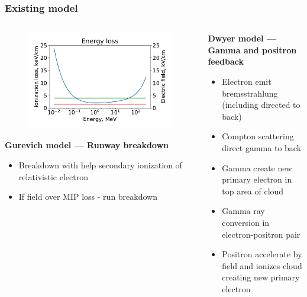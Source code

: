 \documentclass[8pt,pdf,hyperref={unicode}]{beamer}
\begin{document}
\begin{frame}
\frametitle{Existing model}
\begin{columns}
\begin{column}{0.5\textwidth}
    \begin{figure}[htb]
        \centering
        \includegraphics[width=1\columnwidth]{01_Gurevich.pdf}
    \end{figure}
{\large     \textbf{Gurevich model --- Runway breakdown}
\begin{itemize}
    \item Breakdown with help secondary ionization of relativistic electron
    \item If field over MIP loss - run breakdown
\end{itemize}}
\end{column}
\begin{column}{0.5\textwidth}
{\large      \textbf{Dwyer model --- Gamma and positron feedback}
    \begin{itemize}
        \item Electron emit bremsstrahlung (including directed to back)
        \item Compton scattering direct gamma to back 
        \item Gamma create new primary electron in top area of cloud
        \item Gamma ray conversion in electron-positron pair
        \item Positron accelerate by field and ionizes cloud creating new primary electron
        
    \end{itemize}}
\end{column}
\end{columns}

\end{frame}
\end{document}
